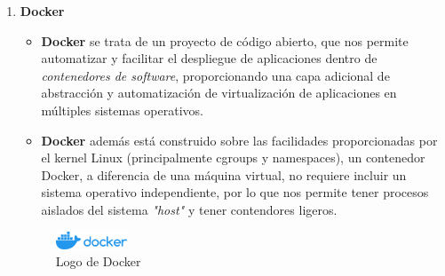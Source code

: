 \documentclass[a4paper]{article}
\begin{document}
\begin{enumerate}
    \item \textbf{Docker}
          \begin{itemize}
              \item \textbf{Docker} se trata de un proyecto de código abierto, que nos permite automatizar y facilitar el despliegue de aplicaciones dentro de \textit{contenedores de software}, proporcionando una capa adicional de abstracción y automatización de virtualización de aplicaciones en múltiples sistemas operativos.
              \item \textbf{Docker} además está construido sobre las facilidades proporcionadas por el kernel Linux (principalmente cgroups y namespaces), un contenedor Docker, a diferencia de una máquina virtual, no requiere incluir un sistema operativo independiente, por lo que nos permite tener procesos aislados del sistema \textit{"host"} y tener contendores ligeros.
          \end{itemize}
          \begin{figure}[h]
            \centering
            \includegraphics[width=0.2\textwidth]{Images/docker.png} %
            \caption{Logo de Docker}
            \label{fig:docker}
        \end{figure}
        

\end{enumerate}
\end{document}
